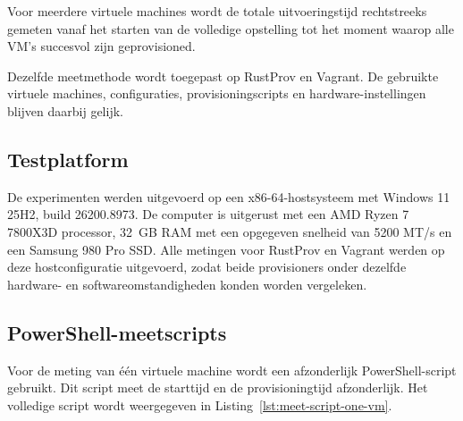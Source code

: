 Voor meerdere virtuele machines wordt de totale uitvoeringstijd rechtstreeks
gemeten vanaf het starten van de volledige opstelling tot het moment waarop alle
VM's succesvol zijn geprovisioned.

Dezelfde meetmethode wordt toegepast op RustProv en Vagrant. De gebruikte
virtuele machines, configuraties, provisioningscripts en
hardware-instellingen blijven daarbij gelijk.

\subsection{Testplatform}

De experimenten werden uitgevoerd op een x86-64-hostsysteem met Windows 11
25H2, build 26200.8973. De computer is uitgerust met een AMD Ryzen 7 7800X3D
processor, 32~GB RAM met een opgegeven snelheid van 5200 MT/s en een Samsung
980 Pro SSD. Alle metingen voor RustProv en Vagrant werden op deze
hostconfiguratie uitgevoerd, zodat beide provisioners onder dezelfde
hardware- en softwareomstandigheden konden worden vergeleken.


\subsection{PowerShell-meetscripts}

Voor de meting van één virtuele machine wordt een afzonderlijk PowerShell-script
gebruikt. Dit script meet de starttijd en de provisioningtijd afzonderlijk. Het
volledige script wordt weergegeven in
Listing~\ref{lst:meet-script-one-vm}.

